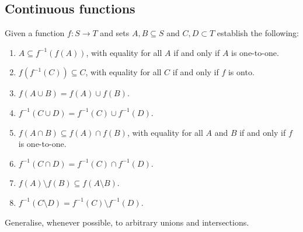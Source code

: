 \subsection{Continuous functions}


\begin{exercise}{1}
Given a function $f:S\to T$ and sets $A,B\subseteq S$ and $C,D\subset T$ establish the following:
\begin{enumerate}
    \item $A \subseteq f^{-1}(f(A))$, with equality for all $A$ if and only if $A$ is one-to-one.
    \item $f(f^{-1}(C))\subseteq C$, with equality for all $C$ if and only if $f$ is onto.
    \item $f(A\cup B)= f(A)\cup f(B)$.
    \item $f^{-1}(C\cup D)=f^{-1}(C)\cup f^{-1}(D)$.
    \item $f(A\cap B)\subseteq f(A)\cap f(B)$, with equality for all $A$ and $B$ if and only if $f$ is one-to-one.
    \item $f^{-1}(C\cap D)=f^{-1}(C)\cap f^{-1}(D)$.
    \item $f(A)\setminus f(B)\subseteq f(A\setminus B)$.
    \item $f^{-1}(C\setminus D)= f^{-1}(C)\setminus f^{-1}(D)$.
\end{enumerate}
Generalise, whenever possible, to arbitrary unions and intersections.
\end{exercise}
